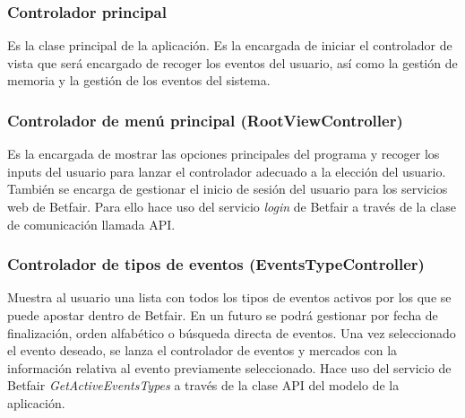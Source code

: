    
    
\subsubsection{Controlador principal}

 Es la clase principal de la aplicación. Es la encargada de iniciar el controlador de vista que será encargado de recoger los eventos del usuario, así como la gestión de memoria y la gestión de los eventos del sistema.
 
\subsubsection{Controlador de menú principal (RootViewController)}
 Es la encargada de mostrar las opciones principales del programa y recoger los inputs del usuario para lanzar el controlador adecuado a la elección del usuario. También se encarga de gestionar el inicio de sesión del usuario para los servicios web de Betfair. Para ello hace uso del servicio \emph{login} de Betfair a través de la clase de comunicación llamada API.
 
\subsubsection{Controlador de tipos de eventos (EventsTypeController)}
 Muestra al usuario una lista con todos los tipos de eventos activos por los que se puede apostar dentro de Betfair. En un futuro se podrá gestionar por fecha de finalización, orden alfabético o búsqueda directa de eventos. Una vez seleccionado el evento deseado, se lanza el controlador de eventos y mercados con la información relativa al evento previamente seleccionado. Hace uso del servicio de Betfair \emph{GetActiveEventsTypes}  a través de la clase API del modelo de la aplicación.
 
